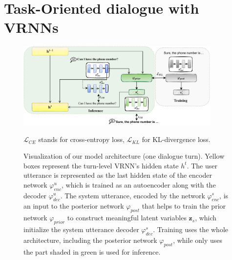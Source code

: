 \section{Task-Oriented dialogue with VRNNs}
\begin{figure}[t]
    \centering
    \includegraphics[width=0.9\textwidth]{images/vrnn-diagram.pdf}
    \caption{Visualization of our model architecture (one dialogue turn). Yellow boxes represent the turn-level VRNN's hidden state $h^t$. The user utterance is represented as the last hidden state of the encoder network $\varphi_{enc}^u$, which is trained as an autoencoder along with the decoder $\varphi_{dec}^u$. The system utterance, encoded by the network $\varphi_{enc}^s$, is an input to the posterior network $\varphi_{post}$ that helps to train the prior network $\varphi_{prior}$ to construct meaningful latent variables $\mathbf{z}_s$, which initialize the system utterance decoder $\varphi_{dec}^s$. Training uses the whole architecture, including the posterior network $\varphi_{post}$, while only uses the part shaded in green is used for inference.} $\mathcal{L}_{CE}$ stands for cross-entropy loss, $\mathcal{L}_{KL}$ for KL-divergence loss.
    \label{05:fig:vrnn_method}
\end{figure}

